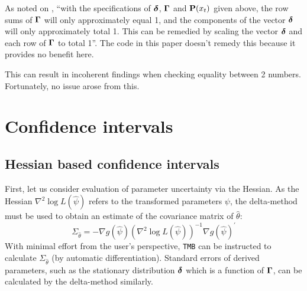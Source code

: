\documentclass[bimj,fleqn]{w-art}\usepackage[]{graphicx}\usepackage[]{color}
\newcommand{\bcp}{{\bf P}}
\newcommand{\bgamma}{\mbox{\boldmath $\Gamma$}}
\newcommand{\bfdelta}{\mbox{\boldmath $\delta$}}
\theoremstyle{plain}
\theoremstyle{definition}
\begin{document}
As noted on \citet[pp. ~159-160]{zucchini}, ``with the specifications of $\bfdelta$, $\bgamma$ and $\bcp(x_t)$ given above, the row sums of $\bgamma$ will only approximately equal 1, and the components of the vector $\bfdelta$ will only approximately total 1. This can be remedied by scaling the vector $\bfdelta$ and each row of $\bgamma$ to total 1''.
The code in this paper doesn't remedy this because it provides no benefit here.

This can result in incoherent findings when checking equality between 2 numbers.
Fortunately, no issue arose from this.


\section{Confidence intervals}
\label{sec:confint}

\subsection{Hessian based confidence intervals}
\label{sec:hessian}

First, let us consider evaluation of parameter uncertainty via the Hessian.
As the Hessian $\nabla^2\log L(\hat{\psi})$ refers to the transformed parameters $\psi$, the delta-method must be used to obtain an estimate of the covariance matrix of $\hat{\theta}$:
\begin{equation}
\Sigma_{\hat{\theta}} = - \nabla g(\hat{\psi})\left(\nabla^2\log L(\hat{\psi})\right)^{-1}\nabla g(\hat{\psi})^\prime
\label{eq:deltamethod}
\end{equation}
With minimal effort from the user's perspective, {\tt{TMB}} can be instructed to calculate $\Sigma_{\hat{\theta}}$ (by automatic differentiation).
Standard errors of derived parameters, such as the stationary distribution $\bfdelta$ which is a function of $\bgamma$, can be calculated by the delta-method similarly.
\end{document}
